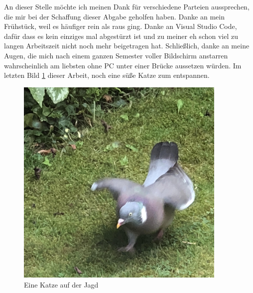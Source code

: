 An dieser Stelle möchte ich meinen Dank für verschiedene Parteien aussprechen, die mir bei der Schaffung
dieser Abgabe geholfen haben. Danke an mein Frühstück, weil es häufiger rein als raus ging. Danke an 
Visual Studio Code, dafür dass es kein einziges mal abgestürzt ist und zu meiner eh schon viel zu 
langen Arbeitszeit nicht noch mehr beigetragen hat. Schließlich, danke an meine Augen, die mich nach einem 
ganzen Semester voller Bildschirm anstarren wahrscheinlich am liebsten ohne PC unter einer Brücke aussetzen
würden. Im letzten Bild \ref{fig:appendix_bird} dieser Arbeit, noch eine süße Katze zum entspannen. 
    \begin{figure}[H]
        \centering
        \includegraphics[width=0.9\textwidth]{graphics/bird.jpg}
        \caption[Tierforschung Beispiel Katze]{Eine Katze auf der Jagd}
        \label{fig:appendix_bird}
    \end{figure}